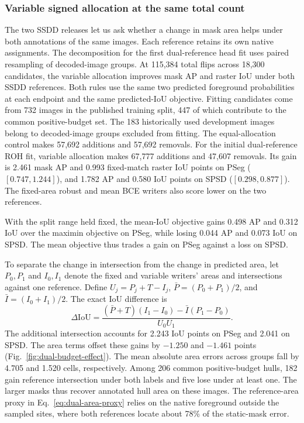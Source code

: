 \documentclass[journal]{IEEEtran}
\begin{document}
\subsubsection{Variable signed allocation at the same total count}
\label{sec:variable-sign-results}
The two SSDD releases let us ask whether a change in mask area helps under both annotations of the same images. Each reference retains its own native assignments. The decomposition for the first dual-reference head fit uses paired resampling of decoded-image groups.
At 115,384 total flips across 18,300 candidates, the variable allocation improves mask AP and raster IoU under both SSDD references. Both rules use the same two predicted foreground probabilities at each endpoint and the same predicted-IoU objective. Fitting candidates come from 732 images in the published training split, 447 of which contribute to the common positive-budget set. The 183 historically used development images belong to decoded-image groups excluded from fitting. The equal-allocation control makes 57,692 additions and 57,692 removals. For the initial dual-reference ROH fit, variable allocation makes 67,777 additions and 47,607 removals. Its gain is 2.461 mask AP and 0.993 fixed-match raster IoU points on PSeg (\([0.747,1.244]\)), and 1.782 AP and 0.580 IoU points on SPSD (\([0.298,0.877]\)). The fixed-area robust and mean BCE writers also score lower on the two references. 

With the split range held fixed, the mean-IoU objective gains 0.498 AP and 0.312 IoU over the maximin objective on PSeg, while losing 0.044 AP and 0.073 IoU on SPSD. The mean objective thus trades a gain on PSeg against a loss on SPSD.

To separate the change in intersection from the change in predicted area, let \(P_0,P_1\) and \(I_0,I_1\) denote the fixed and variable writers' areas and intersections against one reference. Define \(U_j=P_j+T-I_j\), \(\bar P=(P_0+P_1)/2\), and \(\bar I=(I_0+I_1)/2\). The exact IoU difference is
\begin{equation}
 \Delta\mathrm{IoU} =
 \frac{(\bar P+T)(I_1-I_0)-\bar I(P_1-P_0)}{U_0 U_1}.
 \label{eq:area-overlap-parts}
\end{equation}
The additional intersection accounts for 2.243 IoU points on PSeg and 2.041 on SPSD. The area terms offset these gains by \(-1.250\) and \(-1.461\) points (Fig.~\ref{fig:dual-budget-effect}). The mean absolute area errors across groups fall by 4.705 and 1.520 cells, respectively. Among 206 common positive-budget hulls, 182 gain reference intersection under both labels and five lose under at least one. The larger masks thus recover annotated hull area on these images. The reference-area proxy in Eq.~\eqref{eq:dual-area-proxy} relies on the native foreground outside the sampled sites, where both references locate about 78\% of the static-mask error.
\end{document}
